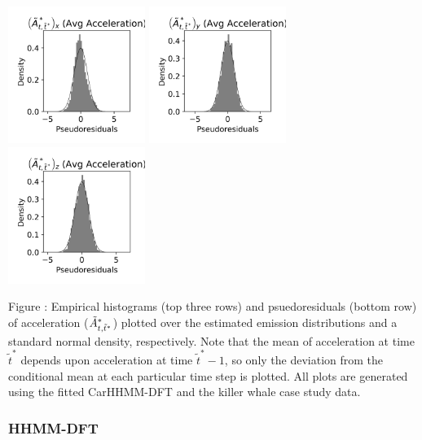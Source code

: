 \documentclass{article}
\begin{document}
\begin{center}
        \includegraphics[width=1.75in]{../Plots/CarHHMM2_psedoresids_Ax.png}
        \includegraphics[width=1.75in]{../Plots/CarHHMM2_psedoresids_Ay.png}
        \includegraphics[width=1.75in]{../Plots/CarHHMM2_psedoresids_Az.png}
        \end{center}
        
        \noindent Figure : Empirical histograms (top three rows) and psuedoresiduals (bottom row) of acceleration ($\tilde{A}^*_{t,\tilde t^*}$) plotted over the estimated emission distributions and a standard normal density, respectively. Note that the mean of acceleration at time $\tilde t^*$ depends upon acceleration at time $\tilde t^*-1$, so only the deviation from the conditional mean at each particular time step is plotted. All plots are generated using the fitted CarHHMM-DFT and the killer whale case study data.
        \addtocounter{fignum}{1}
        
        \newpage
        
        \subsubsection{HHMM-DFT}
        
\end{document}
